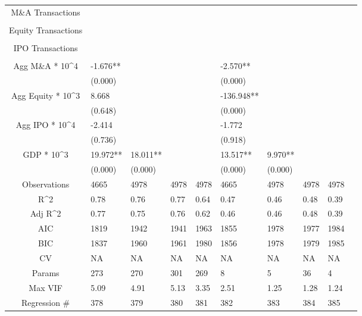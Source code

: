 \documentclass{article}
\begin{document}
\begin{table}[H]
\begin{tabular}{|clllllllll|}
  M\&A Transactions &  &  &  &  &  &  &  &  & \\ 
   &  &  &  &  &  &  &  &  & \\ 
  Equity Transactions &  &  &  &  &  &  &  &  & \\ 
   &  &  &  &  &  &  &  &  & \\ 
  IPO Transactions &  &  &  &  &  &  &  &  & \\ 
   &  &  &  &  &  &  &  &  & \\ 
  Agg M\&A * 10^4 & -1.676** &  &  &  & -2.570** &  &  &  & \\ 
   & (0.000) &  &  &  & (0.000) &  &  &  & \\ 
  Agg Equity * 10^3 & 8.668 &  &  &  & -136.948** &  &  &  & \\ 
   & (0.648) &  &  &  & (0.000) &  &  &  & \\ 
  Agg IPO * 10^4 & -2.414 &  &  &  & -1.772 &  &  &  & \\ 
   & (0.736) &  &  &  & (0.918) &  &  &  & \\ 
  GDP * 10^3 & 19.972** & 18.011** &  &  & 13.517** & 9.970** &  &  & \\ 
   & (0.000) & (0.000) &  &  & (0.000) & (0.000) &  &  & \\ 
  \hline 
 Observations & 4665 & 4978 & 4978 & 4978 & 4665 & 4978 & 4978 & 4978 & \\ 
  R^2 & 0.78 & 0.76 & 0.77 & 0.64 & 0.47 & 0.46 & 0.48 & 0.39 & \\ 
  Adj R^2 & 0.77 & 0.75 & 0.76 & 0.62 & 0.46 & 0.46 & 0.48 & 0.39 & \\ 
  AIC & 1819 & 1942 & 1941 & 1963 & 1855 & 1978 & 1977 & 1984 & \\ 
  BIC & 1837 & 1960 & 1961 & 1980 & 1856 & 1978 & 1979 & 1985 & \\ 
  CV & NA & NA & NA & NA & NA & NA & NA & NA & \\ 
  Params & 273 & 270 & 301 & 269 & 8 & 5 & 36 & 4 & \\ 
  Max VIF & 5.09 & 4.91 & 5.13 & 3.35 & 2.51 & 1.25 & 1.28 & 1.24 & \\ 
  Regression \# & 378 & 379 & 380 & 381 & 382 & 383 & 384 & 385 & \\ 
   \hline
\end{tabular}
 
\end{table}
\end{document}
